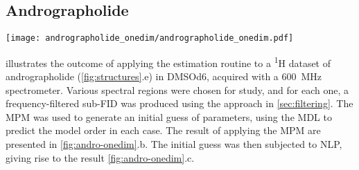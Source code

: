 \subsection{Andrographolide}
\label{subsec:andro}
\begin{sidewaysfigure}
    \centering
    \texttt{[image: andrographolide\_onedim/andrographolide\_onedim.pdf]}
    \caption[
        Result of applying the estimation routine to selected regions of a
        pulse-acquire dataset of andrographolide.
    ]{
        Result of applying the estimation routine to selected regions of a
        pulse-acquire dataset of andrographolide in \acs{DMSOd6}.
        \textbf{a.} Spectral regions considered.
        \textbf{b.} The result of applying the \acs{MPM} to the regions, with
        the model order predicted using the \acs{MDL}. Blue and red lines denote
        individual oscillator peaks, while the grey line above is the sum of all
        oscillators. They grey line below is the residual between the data and
        the model.
        \textbf{c.} The result after convergence of the \acs{NLP} routine, again
        with the model above and residual below.
        Red peaks in b correspond to oscillators which acquire negative
        amplitudes and are removed during the \acs{NLP} routine.
        One of the estimated regions has been split in two in the
        figure to save space, with one half, featuring a signal from ethanol,
        being magnified.
    }
    \label{fig:andro-onedim}
\end{sidewaysfigure}
 illustrates the outcome of applying the
estimation routine to a \textsuperscript{1}H dataset of
andrographolide (\cref{fig:structures}.e) in \acs{DMSOd6}, acquired with
a \qty{600}{\mega\hertz} spectrometer.
Various spectral regions were chosen for study, and for each one, a
frequency-filtered sub-\ac{FID} was produced using the approach in
\cref{sec:filtering}.
The \ac{MPM} was used to generate an initial guess of parameters, using the
\ac{MDL} to predict the model order in each case. The result of applying the
\ac{MPM} are presented in \cref{fig:andro-onedim}.b. The initial guess
was then subjected to \ac{NLP}, giving rise to the result
\cref{fig:andro-onedim}.c.

